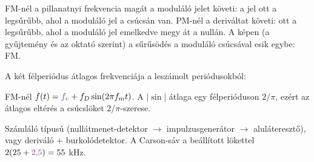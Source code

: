 FM-nél a pillanatnyi frekvencia magát a moduláló jelet követi: a jel ott a legsűrűbb, ahol a moduláló jel a csúcsán van. PM-nél a deriváltat követi: ott a legsűrűbb, ahol a moduláló jel emelkedve megy át a nullán. A képen (a gyűjtemény és az oktató szerint) a sűrűsödés a moduláló csúcsával esik egybe: FM.

A két félperiódus átlagos frekvenciája a leszámolt periódusokból:

\begin{center}\end{center}

FM-nél $f(t)={\ca{f_v}}+f_D\sin(2\pi f_mt)$. A $|\sin|$ átlaga egy félperióduson $2/\pi$, ezért az átlagos eltérés a csúcslöket $2/\pi$-szerese.

\begin{center}\end{center}

\begin{center}\end{center}

Számláló típusú (nullátmenet-detektor $\to$ impulzusgenerátor $\to$ aluláteresztő), vagy deriváló + burkolódetektor. A Carson-sáv a beállított lökettel $2(25+{\cc{2{,}5}})=55$ kHz.

